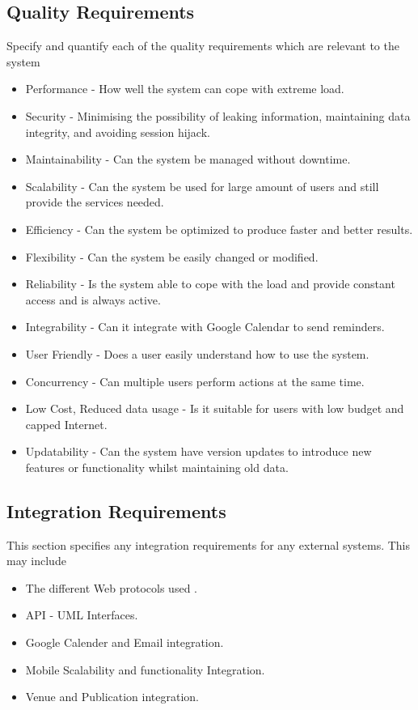 \documentclass[a4paper]{article}
\begin{document}
	\subsection{Quality Requirements}
	Specify and quantify each of the quality requirements which are relevant to the system
	\begin{itemize}
		\item Performance - How well the system can cope with extreme load.
		\item Security - Minimising the possibility of leaking information, maintaining data integrity, and avoiding session hijack.
		\item Maintainability - Can the system be managed without downtime.
		\item Scalability - Can the system be used for large amount of users and still provide the services needed.
		\item Efficiency - Can the system be optimized to produce faster and better results.
		\item Flexibility - Can the system be easily changed or modified.
		\item Reliability - Is the system able to cope with the load and provide constant access and is always active.
		\item Integrability - Can it integrate with Google Calendar to send reminders.
		\item User Friendly - Does a user easily understand how to use the system.
		\item Concurrency - Can multiple users perform actions at the same time.
		\item Low Cost, Reduced data usage - Is it suitable for users with low budget and capped Internet.
		\item Updatability - Can the system have version updates to introduce new features or functionality whilst maintaining old data.
		\\
	\end{itemize}
	
	\subsection{Integration Requirements}
	This section specifies any integration requirements for any external systems. This may include
	\begin{itemize}
		\item The different Web protocols used .
		\item API - UML Interfaces.
		\item Google Calender and Email integration.
		\item Mobile Scalability and functionality Integration.
		\item Venue and Publication integration.
		\\
	\end{itemize}
	
\end{document}
